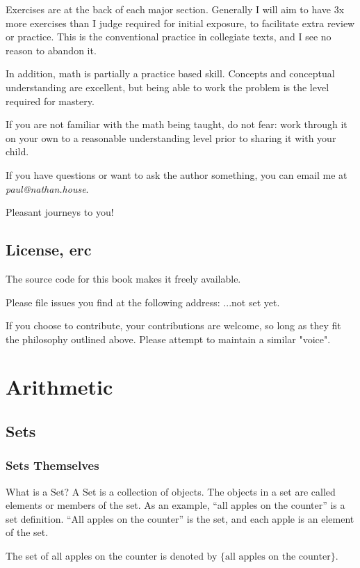 Exercises are at the back of each major section. Generally I will aim to have 3x more exercises than I judge required for initial exposure, to facilitate extra review or practice. This is the conventional practice in collegiate texts, and I see no reason to abandon it. 

In addition, math is partially a practice based skill. Concepts and conceptual understanding are excellent, but being able to work the problem is the level required for mastery. 

If you are not familiar with the math being taught, do not fear: work through it on your own to a reasonable understanding level prior to sharing it with your child. 


If you have questions or want to ask the author something, you can email me at \textit{paul@nathan.house}.

Pleasant journeys to you!

\section{License, erc}

The source code for this book makes it freely available. 

Please file issues you find at the following address: ...not set yet.

If you choose to contribute, your contributions are welcome, so long as they fit the philosophy outlined above. Please attempt to maintain a similar "voice".

\chapter{Arithmetic}

\section{Sets}
\subsection{Sets Themselves}
What is a Set?
A Set is a collection of objects.
The objects in a set are called elements or members of the set.
As an example, ``all apples on the counter'' is a set definition.
``All apples on the counter'' is the set, and each apple is an element of the set.

The set of all apples on the counter is denoted by $\{ \text{all apples on the counter} \}$.

